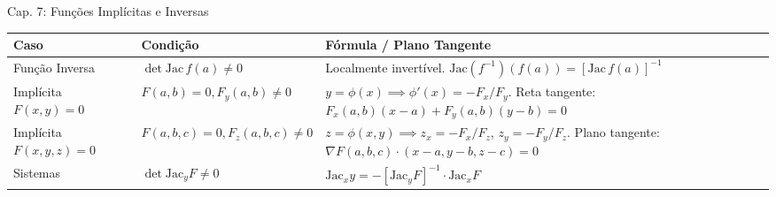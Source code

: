 \documentclass[11pt,a4paper]{article}
\begin{document}
\begin{definitionbox}[breakable, left=4pt, right=4pt, top=4pt, bottom=4pt, boxrule=0.6pt, colframe=primaryColor]{Cap. 7: Funções Implícitas e Inversas}
  \def\arraystretch{1.2}
  \begin{tabular}{|p{2.2cm}|p{4.2cm}|p{10.2cm}|}
    \hline
    \textbf{Caso} & \textbf{Condição} & \textbf{Fórmula / Plano Tangente} \\ \hline
    Função Inversa & $\det \text{Jac}\,f(a) \neq 0$ & Localmente invertível. $\text{Jac}(f^{-1})(f(a)) = [\text{Jac}\,f(a)]^{-1}$ \\ \hline
    Implícita $F(x,y)=0$ & $F(a,b)=0, F_y(a,b)\neq0$ & $y = \phi(x) \implies \phi'(x) = -F_x / F_y$. \newline
    Reta tangente: $F_x(a,b)(x-a) + F_y(a,b)(y-b) = 0$ \\ \hline
    Implícita $F(x,y,z)=0$ & $F(a,b,c)=0, F_z(a,b,c)\neq0$ & $z = \phi(x,y) \implies z_x = -F_x/F_z$, $z_y = -F_y/F_z$. \newline
    Plano tangente: $\nabla F(a,b,c) \cdot (x-a, y-b, z-c) = 0$ \\ \hline
    Sistemas & $\det \text{Jac}_y F \neq 0$ & $\text{Jac}_x y = - [\text{Jac}_y F]^{-1} \cdot \text{Jac}_x F$ \\ \hline
  \end{tabular}
\end{definitionbox}
\end{document}
